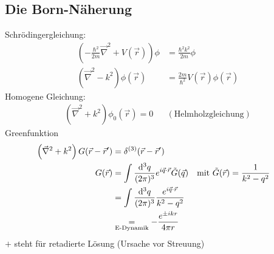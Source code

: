 \subsection{Die Born-Näherung}
	Schrödingergleichung:
		\begin{align*}
			\left(- \frac{\hbar^2}{2 m} \vec{\nabla}^2 + V (\vec{r})\right) \phi
			&= \frac{\hbar^2 k^2}{2m} \phi \\
			\left(\vec{\nabla}^2 - k^2\right) \phi(\vec{r}) 
			&= \frac{2m}{\hbar^2} V (\vec{r}) \phi (\vec{r})
		\end{align*}
	Homogene Gleichung:
		\begin{align*}
			\left(\vec{\nabla}^2 + k^2 \right) \phi_0 (\vec{r}) = 0 &
			&(\text{Helmholzgleichung}) 
		\end{align*}
	Greenfunktion
		\begin{align*}
			\left(\vec{\nabla}^2 + k^2 \right) G (\vec{r} - \vec{r}') 
			&= \delta^{(3)}(\vec{r} - \vec{r}') \\
			G(\vec{r}) &= 
			\int \frac{\mathrm{d}^3 q}{(2 \pi)^3} e^{i \vec{q} \cdot \vec{r}} \tilde{G}(\vec{q})
			&\text{mit } \tilde{G} (\vec{r}) &= \frac{1}{k^2-q^2} \\
			&= \int \frac{\mathrm{d}^3 q}{(2 \pi)^3} \frac{e^{i \vec{q} \cdot \vec{r}}}{k^2 - q^2} \\
			&\underset{\text{E-Dynamik}}{=} - \frac{e^{\pm i k r}}{4 \pi r}
		\end{align*}
	$+$ steht für retadierte Lösung (Ursache vor Streuung)
	
